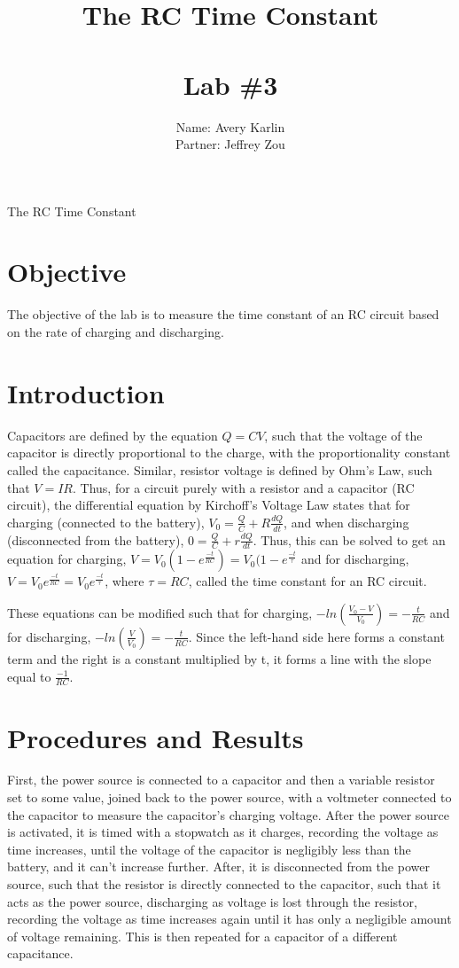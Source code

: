 \documentclass[11pt, titlepage]{article}
\title{The RC Time Constant \\ \ \\ \large Lab \#3}
\author{Name: Avery Karlin \\ Partner: Jeffrey Zou}
\date{}
\begin{document}
\maketitle

\begin{center}
\LARGE The RC Time Constant
\end{center}

\section*{Objective}
The objective of the lab is to measure the time constant of an RC circuit based on the rate of charging and discharging.

\section*{Introduction}
Capacitors are defined by the equation $Q = CV$, such that the voltage of the capacitor is directly proportional to the charge, with the proportionality constant called the capacitance. Similar, resistor voltage is defined by Ohm's Law, such that $V = IR$. Thus, for a circuit purely with a resistor and a capacitor (RC circuit), the differential equation by Kirchoff's Voltage Law states that for charging (connected to the battery), $V_0 = \frac{Q}{C} + R\frac{dQ}{dt}$, and when discharging (disconnected from the battery), $0 = \frac{Q}{C} + r\frac{dQ}{dt}$. Thus, this can be solved to get an equation for charging, $V = V_0(1 - e^{\frac{-t}{RC}}) = V_0(1 - e^{\frac{-t}{\tau}}$ and for discharging, $V = V_0e^{\frac{-t}{RC}} = V_0e^{\frac{-t}{\tau}}$, where $\tau = RC$, called the time constant for an RC circuit.

These equations can be modified such that for charging, $-ln(\frac{V_0 - V}{V_0}) = -\frac{t}{RC}$ and for discharging, $-ln(\frac{V}{V_0}) = -\frac{t}{RC}$. Since the left-hand side here forms a constant term and the right is a constant multiplied by t, it forms a line with the slope equal to $\frac{-1}{RC}$.

\section*{Procedures and Results}

First, the power source is connected to a capacitor and then a variable resistor set to some value, joined back to the power source, with a voltmeter connected to the capacitor to measure the capacitor's charging voltage. After the power source is activated, it is timed with a stopwatch as it charges, recording the voltage as time increases, until the voltage of the capacitor is negligibly less than the battery, and it can't increase further. After, it is disconnected from the power source, such that the resistor is directly connected to the capacitor, such that it acts as the power source, discharging as voltage is lost through the resistor, recording the voltage as time increases again until it has only a negligible amount of voltage remaining. This is then repeated for a capacitor of a different capacitance.
\end{document}

